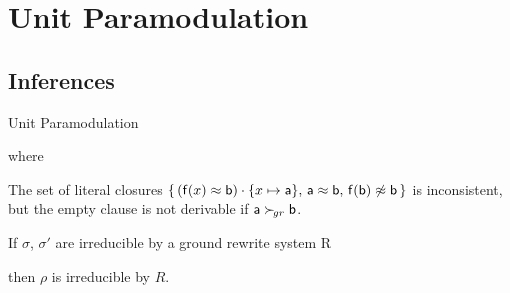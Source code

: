 \documentclass[%
handout,
]{beamer}
\begin{document}
\section{Unit Paramodulation}
\subsection{Inferences}
\begin{frame}{Unit Paramodulation}


    
    where
    

    \vspace{0.3em}

        \begin{example}
    The set of literal closures
    $\{\,
    (\mathsf{f}(x)\approx\mathsf{b})\cdot\{x\mapsto\mathsf{a}\},\,
    \mathsf{a}\approx \mathsf{b},\,
    \mathsf{f}(\mathsf{b})\not\approx\mathsf{b}\,
    \}$ is inconsistent,
    but the empty clause is not derivable
    if $\mathsf{a}\mathrel\succ_{\!gr}\mathsf{b}$.
        \end{example}

        \vspace{0.3em}

    \begin{lemma}
        If $\sigma$, $\sigma'$ are irreducible by a ground rewrite system R

        then $\rho$ is irreducible by $R$.
    \end{lemma}

\end{frame}
\end{document}

